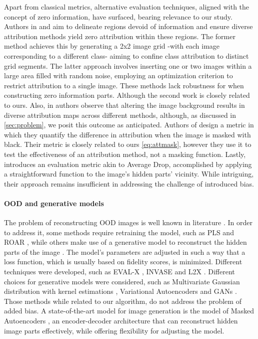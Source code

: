 Apart from classical metrics, alternative evaluation techniques, aligned with the concept of zero information, have surfaced, bearing relevance to our study. 
Authors in \citep{9879032} and \citep{khakzar2022explanations} aim to delineate regions devoid of information and ensure diverse attribution methods yield zero attribution within these regions. 
The former method achieves this by generating a 2x2 image grid -with each image corresponding to a different class- aiming to confine class attribution to distinct grid segments. The latter approach involves inserting one or two images within a large area filled with random noise, employing an optimization criterion to restrict attribution to a single image.
These methods lack robustness for when constructing zero information parts. 
Although the second work is closely related to ours. 
Also, in \citep{kindermans2017unreliability} authors observe that altering the image background results in diverse attribution maps across different methods, although, as discussed in \autoref{sec:problem}, we posit this outcome as anticipated.
Authors of \citep{fakecam} design a metric in which they quantify the difference in attribution when the image is masked with black. 
Their metric is closely related to ours \autoref{eq:attmask}, however they use it to test the effectiveness of an attribution method, not a masking function. 
Lastly, \citep{rong2022consistent} introduces an evaluation metric akin to Average Drop, accomplished by applying a straightforward function to the image's hidden parts' vicinity. 
While intriguing, their approach remains insufficient in addressing the challenge of introduced bias. \newline

\paragraph{OOD and generative models}

The problem of reconstructing OOD images is well known in literature \citep{qiu2021resisting, janzing20a}. In order to address it, some methods require retraining the model, such as PLS \citep{hase2021outofdistribution} and ROAR \citep{hooker2019benchmark}, while others make use of a generative model to reconstruct the hidden parts of the image \citep{chang2019explaining}. The model's parameters are adjusted in such a way that a loss function, which is usually based on fidelity scores, is minimized. Different techniques were developed, such as EVAL-X \citep{jethani2021learned}, INVASE \citep{yoon2018invase} and L2X \citep{chen2018learning}. Different choices for generative models were considered, such as Multivariate Gaussian distribution with kernel estimations \citep{janzing2019feature}, Variational Autoencoders and GANs \citep{chang2019explaining}. Those methods while related to our algorithm, do not address the problem of added bias. A state-of-the-art model for image generation is the model of Masked Autoencoders \citep{9879206}, an encoder-decoder architecture that can reconstruct hidden image parts effectively, while offering flexibility for adjusting the model. 

